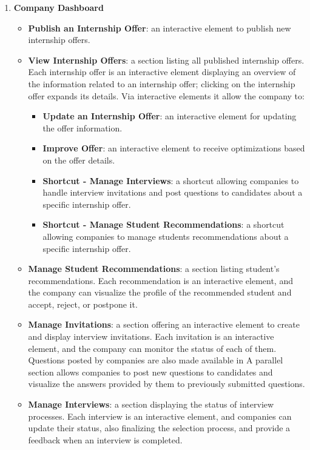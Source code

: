 \begin{enumerate}
    \item \textbf{Company Dashboard}
    \begin{itemize}      
        \item \textbf{Publish an Internship Offer}: an interactive element to publish new internship offers.
        \item \textbf{View Internship Offers}: a section listing all published internship offers. Each internship offer is an interactive element displaying an overview of the information related to an internship offer; clicking on the internship offer expands its details.
        Via interactive elements it allow the company to:
        \begin{itemize}
            \item \textbf{Update an Internship Offer}: an interactive element for updating the offer information.
            \item \textbf{Improve Offer}: an interactive element to receive optimizations based on the offer details.
            \item \textbf{Shortcut - Manage Interviews}: a shortcut allowing companies to handle interview invitations and post questions to candidates about a specific internship offer.
            \item \textbf{Shortcut - Manage Student Recommendations}: a shortcut allowing companies to manage students recommendations about a specific internship offer.
        \end{itemize}
        \item \textbf{Manage Student Recommendations}: a section listing student's recommendations. Each recommendation is an interactive element, and the company can visualize the profile of the recommended student and accept, reject, or postpone it.
        \item \textbf{Manage Invitations}: a section offering an interactive element to create and display interview invitations. Each invitation is an interactive element, and the company can monitor the status of each of them. Questions posted by companies are also made available in A parallel section allows companies to post new questions to candidates and visualize the answers provided by them to previously submitted questions.
        \item \textbf{Manage Interviews}: a section displaying the status of interview processes. Each interview is an interactive element, and companies can update their status, also finalizing the selection process, and provide a feedback when an interview is completed.

\end{itemize}
\end{enumerate}
